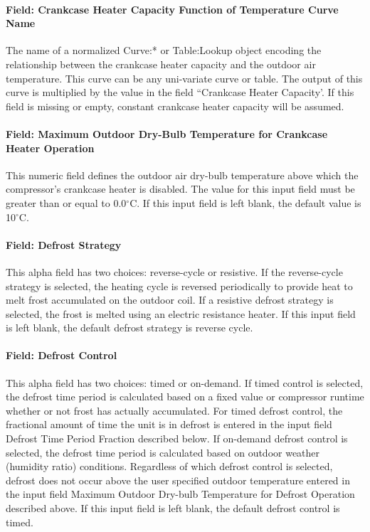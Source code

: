 \paragraph{Field: Crankcase Heater Capacity Function of Temperature Curve Name}

The name of a normalized Curve:* or Table:Lookup object encoding the relationship between the crankcase heater capacity and the outdoor air temperature. This curve can be any uni-variate curve or table. The output of this curve is multiplied by the value in the field ``Crankcase Heater Capacity'. If this field is missing or empty, constant crankcase heater capacity will be
assumed.

\paragraph{Field: Maximum Outdoor Dry-Bulb Temperature for Crankcase Heater Operation}\label{field-maximum-outdoor-dry-bulb-temperature-for-crankcase-heater-operation-6}

This numeric field defines the outdoor air dry-bulb temperature above which the compressor's crankcase heater is disabled. The value for this input field must be greater than or equal to 0.0$^\circ$C. If this input field is left blank, the default value is 10$^\circ$C.

\paragraph{Field: Defrost Strategy}\label{field-defrost-strategy-2}

This alpha field has two choices: reverse-cycle or resistive. If the reverse-cycle strategy is selected, the heating cycle is reversed periodically to provide heat to melt frost accumulated on the outdoor coil. If a resistive defrost strategy is selected, the frost is melted using an electric resistance heater. If this input field is left blank, the default defrost strategy is reverse cycle.

\paragraph{Field: Defrost Control}\label{field-defrost-control-2}

This alpha field has two choices: timed or on-demand. If timed control is selected, the defrost time period is calculated based on a fixed value or compressor runtime whether or not frost has actually accumulated. For timed defrost control, the fractional amount of time the unit is in defrost is entered in the input field Defrost Time Period Fraction described below. If on-demand defrost control is selected, the defrost time period is calculated based on outdoor weather (humidity ratio) conditions. Regardless of which defrost control is selected, defrost does not occur above the user specified outdoor temperature entered in the input field Maximum Outdoor Dry-bulb Temperature for Defrost Operation described above. If this input field is left blank, the default defrost control is timed.


